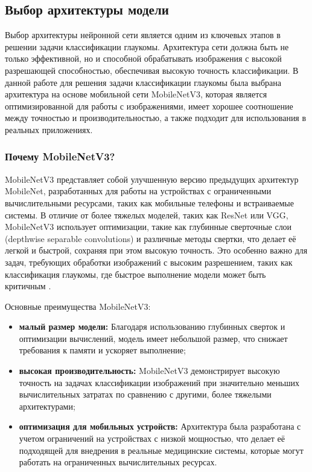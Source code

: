 {    \subsection{Выбор архитектуры модели}

    Выбор архитектуры нейронной сети является одним из ключевых этапов в решении задачи классификации глаукомы. Архитектура сети должна быть не только эффективной, но и способной обрабатывать изображения с высокой разрешающей способностью, обеспечивая высокую точность классификации. В данной работе для решения задачи классификации глаукомы была выбрана архитектура на основе мобильной сети MobileNetV3, которая является оптимизированной для работы с изображениями, имеет хорошее соотношение между точностью и производительностью, а также подходит для использования в реальных приложениях.

    \subsubsection*{Почему MobileNetV3?}

    MobileNetV3 представляет собой улучшенную версию предыдущих архитектур MobileNet, разработанных для работы на устройствах с ограниченными вычислительными ресурсами, таких как мобильные телефоны и встраиваемые системы. В отличие от более тяжелых моделей, таких как ResNet или VGG, MobileNetV3 использует оптимизации, такие как глубинные сверточные слои (depthwise separable convolutions) и различные методы свертки, что делает её легкой и быстрой, сохраняя при этом высокую точность. Это особенно важно для задач, требующих обработки изображений с высоким разрешением, таких как классификация глаукомы, где быстрое выполнение модели может быть критичным \cite{mobilenet}.

    Основные преимущества MobileNetV3:

    \begin{itemize}
        \item \textbf{малый размер модели:} Благодаря использованию глубинных сверток и оптимизации вычислений, модель имеет небольшой размер, что снижает требования к памяти и ускоряет выполнение;
        \item \textbf{высокая производительность:} MobileNetV3 демонстрирует высокую точность на задачах классификации изображений при значительно меньших вычислительных затратах по сравнению с другими, более тяжелыми архитектурами;
        \item \textbf{оптимизация для мобильных устройств:} Архитектура была разработана с учетом ограничений на устройствах с низкой мощностью, что делает её подходящей для внедрения в реальные медицинские системы, которые могут работать на ограниченных вычислительных ресурсах.
    \end{itemize}

}
